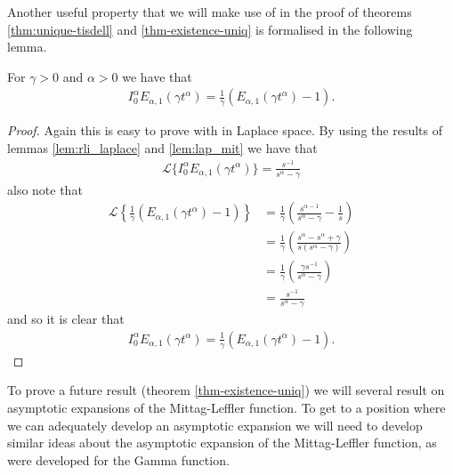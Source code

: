 Another useful property that we will make use of in the proof of theorems \ref{thm:unique-tisdell} and \ref{thm-existence-uniq} is formalised in the following lemma.
\begin{mdframed}[innertopmargin=10pt]
\begin{lemma}	
\label{lem-rli-mit-lef-2}
For $ \gamma > 0 $ and $ \alpha > 0 $ we have that
	\begin{align}
		I_0^\alpha E_{\alpha,1}(\gamma t^\alpha) = \frac{1}{\gamma} \left( E_{\alpha,1}(\gamma t^\alpha) - 1 \right).
	\end{align}
\end{lemma}
\end{mdframed}
\begin{proof}
	Again this is easy to prove with in Laplace space.
	By using the results of lemmas \ref{lem:rli_laplace} and \ref{lem:lap_mit} we have that
	\begin{align}
    	\mathcal{L}\{ I_0^\alpha E_{\alpha, 1}(\gamma t^\alpha) \} = \frac{s^{-1}}{s^\alpha - \gamma}
	\end{align}
	also note that
	\begin{align}
	    \mathcal{L}\left\{ \frac{1}{\gamma}( E_{\alpha, 1}(\gamma t^\alpha) - 1) \right\} &= \frac{1}{\gamma} \left( \frac{s^{\alpha-1}}{s^\alpha - \gamma} - \frac{1}{s} \right) \\
	    &= \frac{1}{\gamma}\left( \frac{s^\alpha - s^\alpha + \gamma}{s(s^\alpha - \gamma)}\right) \\
	    &= \frac{1}{\gamma}\left(\frac{\gamma s^{-1}}{s^\alpha - \gamma}\right) \\
	    &= \frac{s^{-1}}{s^\alpha - \gamma}
	\end{align}
	and so it is clear that
	\begin{align}
I_0^\alpha E_{\alpha,1}(\gamma t^\alpha) = \frac{1}{\gamma} \left( E_{\alpha,1}(\gamma t^\alpha) - 1 \right).
	\end{align}
\end{proof}

To prove a future result (theorem \ref{thm-existence-uniq}) we will several result on asymptotic expansions of the Mittag-Leffler function. To get to a position where we can adequately develop an asymptotic expansion we will need to develop similar ideas about the asymptotic expansion of the Mittag-Leffler function, as were developed for the Gamma function.

